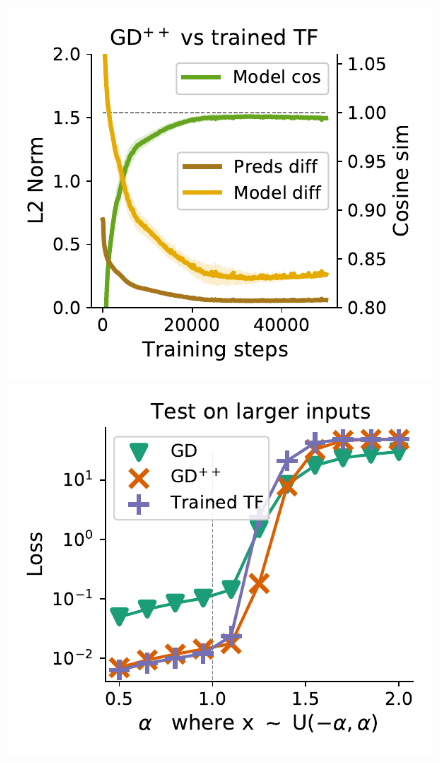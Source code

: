 \documentclass{article}
\theoremstyle{plain}
\theoremstyle{definition}
\theoremstyle{remark}
\begin{document}
\begin{figure}
\begin{center}
\begin{minipage}{.24\textwidth}
\begin{center}
  \end{center}
  \vspace{-10pt}
\end{minipage}
\begin{minipage}{.24\textwidth}
  \centering
  \begin{center}
    \includegraphics[width=1.\textwidth]{Final_figures/linear/linear_five_layer/sim_2.pdf}
  \end{center}
  \vspace{-10pt}
\end{minipage}
\begin{minipage}{.24\textwidth}
  \centering
  \begin{center}
    \includegraphics[width=1.\textwidth]{Final_figures/linear/linear_five_layer/normal.pdf}

\end{center}
\end{minipage}
\end{center}
\end{figure}
\end{document}
